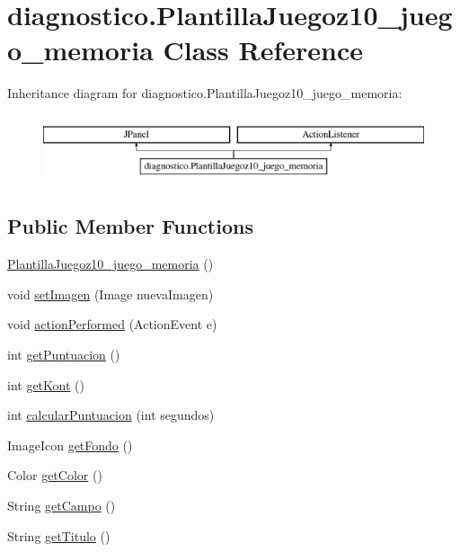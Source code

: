\hypertarget{classdiagnostico_1_1_plantilla_juegoz10__juego__memoria}{}\section{diagnostico.\+Plantilla\+Juegoz10\+\_\+juego\+\_\+memoria Class Reference}
\label{classdiagnostico_1_1_plantilla_juegoz10__juego__memoria}
Inheritance diagram for diagnostico.\+Plantilla\+Juegoz10\+\_\+juego\+\_\+memoria\+:\begin{figure}[H]
\begin{center}
\leavevmode
\includegraphics[height=2.000000cm]{classdiagnostico_1_1_plantilla_juegoz10__juego__memoria}
\end{center}
\end{figure}
\subsection*{Public Member Functions}
\begin{DoxyCompactItemize}
\item 
\mbox{\hyperlink{classdiagnostico_1_1_plantilla_juegoz10__juego__memoria_aa696e2111aa2a68dbe54e8a0142769a6}{Plantilla\+Juegoz10\+\_\+juego\+\_\+memoria}} ()
\item 
void \mbox{\hyperlink{classdiagnostico_1_1_plantilla_juegoz10__juego__memoria_a58e70f67d5862f856d0bdece2665293b}{set\+Imagen}} (Image nueva\+Imagen)
\item 
void \mbox{\hyperlink{classdiagnostico_1_1_plantilla_juegoz10__juego__memoria_a0dae7c730b8d7e8be87d6a3592a6656f}{action\+Performed}} (Action\+Event e)
\item 
int \mbox{\hyperlink{classdiagnostico_1_1_plantilla_juegoz10__juego__memoria_a12b79a55770e647488b855403f1abf85}{get\+Puntuacion}} ()
\item 
int \mbox{\hyperlink{classdiagnostico_1_1_plantilla_juegoz10__juego__memoria_ae3dc557163047b5dedce778ae5fcdefd}{get\+Kont}} ()
\item 
int \mbox{\hyperlink{classdiagnostico_1_1_plantilla_juegoz10__juego__memoria_a50f7768b8718a8bcf0009a44c10c3bb2}{calcular\+Puntuacion}} (int segundos)
\item 
Image\+Icon \mbox{\hyperlink{classdiagnostico_1_1_plantilla_juegoz10__juego__memoria_a5e5ad8a94307adf87cd72469fcf3db65}{get\+Fondo}} ()
\item 
Color \mbox{\hyperlink{classdiagnostico_1_1_plantilla_juegoz10__juego__memoria_acd6dce9433b799ca03b0cbd04b362b01}{get\+Color}} ()
\item 
String \mbox{\hyperlink{classdiagnostico_1_1_plantilla_juegoz10__juego__memoria_a4c470398b766b3fbf051b43a1429eb31}{get\+Campo}} ()
\item 
String \mbox{\hyperlink{classdiagnostico_1_1_plantilla_juegoz10__juego__memoria_aa78e276760e0c5d7811d0623e7eb7388}{get\+Titulo}} ()
\end{DoxyCompactItemize}
